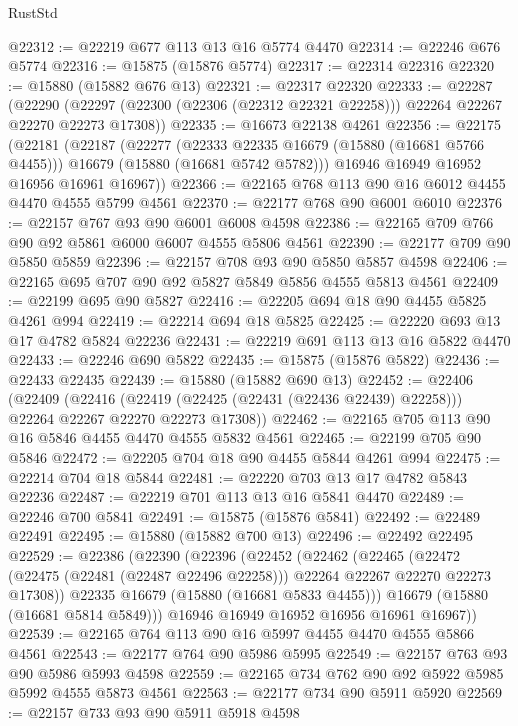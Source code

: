 \begin{lexlean}{RustStd}
\begin{coremodule}
@22312 := @22219 @677 @113 @13 @16 @5774 @4470
@22314 := @22246 @676 @5774
@22316 := @15875 (@15876 @5774)
@22317 := @22314 @22316
@22320 := @15880 (@15882 @676 @13)
@22321 := @22317 @22320
@22333 := @22287
    (@22290 (@22297 (@22300 (@22306 (@22312 @22321 @22258))) @22264 @22267 @22270 @22273 @17308))
@22335 := @16673 @22138 @4261
@22356 := @22175
    (@22181
      (@22187
        (@22277
          (@22333 @22335 @16679 (@15880 (@16681 @5766 @4455)))
          @16679
          (@15880 (@16681 @5742 @5782)))
        @16946
        @16949
        @16952
        @16956
        @16961
        @16967))
@22366 := @22165 @768 @113 @90 @16 @6012 @4455 @4470 @4555 @5799 @4561
@22370 := @22177 @768 @90 @6001 @6010
@22376 := @22157 @767 @93 @90 @6001 @6008 @4598
@22386 := @22165 @709 @766 @90 @92 @5861 @6000 @6007 @4555 @5806 @4561
@22390 := @22177 @709 @90 @5850 @5859
@22396 := @22157 @708 @93 @90 @5850 @5857 @4598
@22406 := @22165 @695 @707 @90 @92 @5827 @5849 @5856 @4555 @5813 @4561
@22409 := @22199 @695 @90 @5827
@22416 := @22205 @694 @18 @90 @4455 @5825 @4261 @994
@22419 := @22214 @694 @18 @5825
@22425 := @22220 @693 @13 @17 @4782 @5824 @22236
@22431 := @22219 @691 @113 @13 @16 @5822 @4470
@22433 := @22246 @690 @5822
@22435 := @15875 (@15876 @5822)
@22436 := @22433 @22435
@22439 := @15880 (@15882 @690 @13)
@22452 := @22406
    (@22409
      (@22416 (@22419 (@22425 (@22431 (@22436 @22439) @22258))) @22264 @22267 @22270 @22273 @17308))
@22462 := @22165 @705 @113 @90 @16 @5846 @4455 @4470 @4555 @5832 @4561
@22465 := @22199 @705 @90 @5846
@22472 := @22205 @704 @18 @90 @4455 @5844 @4261 @994
@22475 := @22214 @704 @18 @5844
@22481 := @22220 @703 @13 @17 @4782 @5843 @22236
@22487 := @22219 @701 @113 @13 @16 @5841 @4470
@22489 := @22246 @700 @5841
@22491 := @15875 (@15876 @5841)
@22492 := @22489 @22491
@22495 := @15880 (@15882 @700 @13)
@22496 := @22492 @22495
@22529 := @22386
    (@22390
      (@22396
        (@22452
          (@22462
            (@22465
              (@22472 (@22475 (@22481 (@22487 @22496 @22258))) @22264 @22267 @22270 @22273 @17308))
            @22335
            @16679
            (@15880 (@16681 @5833 @4455)))
          @16679
          (@15880 (@16681 @5814 @5849)))
        @16946
        @16949
        @16952
        @16956
        @16961
        @16967))
@22539 := @22165 @764 @113 @90 @16 @5997 @4455 @4470 @4555 @5866 @4561
@22543 := @22177 @764 @90 @5986 @5995
@22549 := @22157 @763 @93 @90 @5986 @5993 @4598
@22559 := @22165 @734 @762 @90 @92 @5922 @5985 @5992 @4555 @5873 @4561
@22563 := @22177 @734 @90 @5911 @5920
@22569 := @22157 @733 @93 @90 @5911 @5918 @4598

\end{coremodule}
\end{lexlean}
